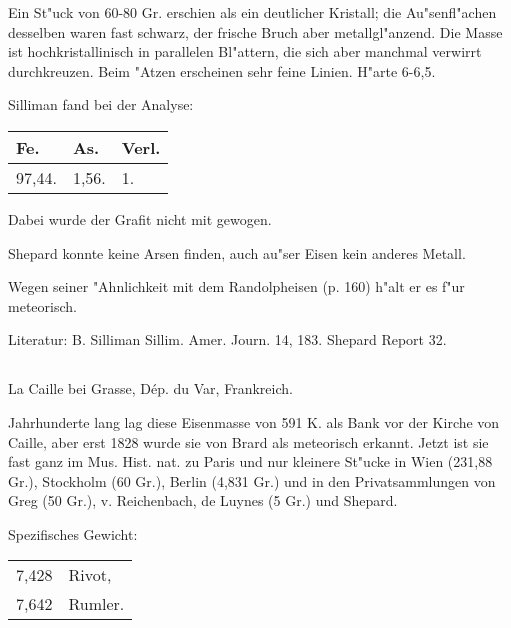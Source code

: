 \documentclass[a4paper, 11pt, oneside]{article}
\begin{document}
Ein St"uck von 60-80 Gr. erschien als ein deutlicher Kristall; die Au"senfl"achen desselben waren fast schwarz, der frische Bruch aber metallgl"anzend. Die Masse ist hochkristallinisch in parallelen Bl"attern, die sich aber manchmal verwirrt durchkreuzen. Beim "Atzen erscheinen sehr feine Linien. H"arte 6-6,5.

Silliman fand bei der Analyse:
\begin{table}[H]
    \centering\swabfamily\Large
    \begin{tabular}{l l l}
        Fe. & As. & Verl. \\ \hline
        97,44. & 1,56. & 1. \\
    \end{tabular}
\end{table}

Dabei wurde der Grafit nicht mit gewogen.

Shepard konnte keine Arsen finden, auch au"ser Eisen kein anderes Metall.

Wegen seiner "Ahnlichkeit mit dem Randolpheisen (p. 160) h"alt er es f"ur meteorisch.

\normalsize
Literatur: B. Silliman Sillim. Amer. Journ. 14, 183. Shepard Report 32.

\subsection{}
\LARGE
\paragraph{}
La Caille bei Grasse, Dép. du Var, Frankreich.

Jahrhunderte lang lag diese Eisenmasse von 591 K. als Bank vor der Kirche von Caille, aber erst 1828 wurde sie von Brard als meteorisch erkannt. Jetzt ist sie fast ganz im Mus. Hist. nat. zu Paris und nur kleinere St"ucke in Wien (231,88 Gr.), Stockholm (60 Gr.), Berlin (4,831 Gr.) und in den Privatsammlungen von Greg (50 Gr.), v. Reichenbach, de Luynes (5 Gr.) und Shepard.

Spezifisches Gewicht:  
\begin{table}[!ht]
    \centering\swabfamily\Large
    \begin{tabular}{l l}
        7,428 & Rivot,\\
        7,642 & Rumler.
    \end{tabular}
\end{table}
\end{document}
